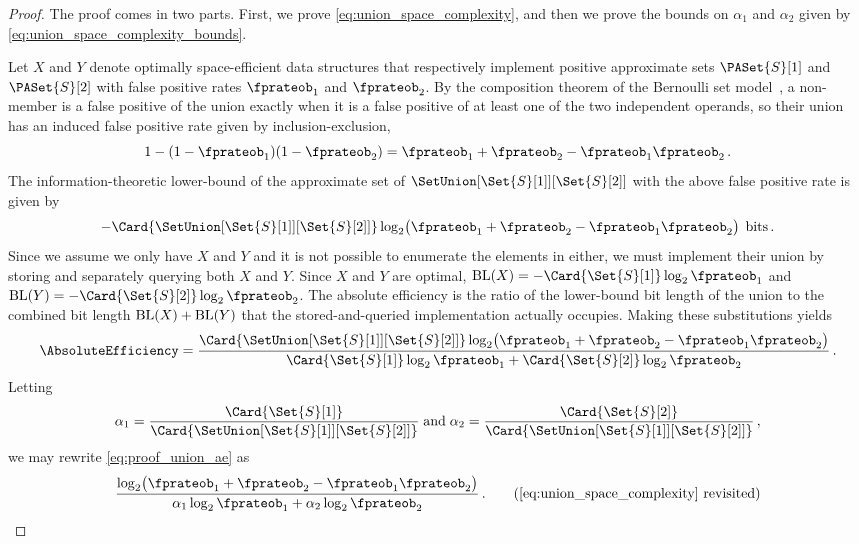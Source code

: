 \documentclass[ ../main.tex]{subfiles}
\begin{document}
\begin{proof}
The proof comes in two parts. First, we prove \cref{eq:union_space_complexity}, 
and then we prove the bounds on $\alpha_1$ and $\alpha_2$ given by 
\cref{eq:union_space_complexity_bounds}.

Let $X$ and $Y$ denote optimally space-efficient data structures that
respectively implement positive approximate sets $\PASet{S}[1]$ and
$\PASet{S}[2]$ with false positive rates $\fprateob_1$ and $\fprateob_2$. By
the composition theorem of the Bernoulli set model~\cite{bsets}, a non-member is
a false positive of the union exactly when it is a false positive of at least
one of the two independent operands, so their union has an induced false
positive rate given by inclusion-exclusion,
\begin{equation}
    1 - (1 - \fprateob_1)(1 - \fprateob_2)
        = \fprateob_1 + \fprateob_2 - \fprateob_1 \fprateob_2\,.
\end{equation}
The information-theoretic lower-bound of the approximate set of
$\SetUnion[\Set{S}[1]][\Set{S}[2]]$ with the above false positive rate is given
by
\begin{equation}
    -\Card{\SetUnion[\Set{S}[1]][\Set{S}[2]]}
        \log_2 \! \left(\fprateob_1 + \fprateob_2 -
        \fprateob_1 \fprateob_2\right) \; \si{bits}\,.
\end{equation}
Since we assume we only have $X$ and $Y$ and it is not possible to enumerate the
elements in either, we must implement their union by storing and separately
querying both $X$ and $Y$. Since $X$ and $Y$ are optimal,
$\BL(X) = -\Card{\Set{S}[1]} \log_2 \fprateob_1$ and
$\BL(Y) = -\Card{\Set{S}[2]} \log_2 \fprateob_2$.
The absolute efficiency is the ratio of the lower-bound bit length of the union
to the combined bit length $\operatorname{BL}(X) + \operatorname{BL}(Y)$ that the stored-and-queried
implementation actually occupies. Making these substitutions yields
\begin{equation}
\label{eq:proof_union_ae}
    \AbsoluteEfficiency = \frac{\Card{\SetUnion[\Set{S}[1]][\Set{S}[2]]} \log_2 \! \left(\fprateob_1 + \fprateob_2 - \fprateob_1 \fprateob_2\right)}{\Card{\Set{S}[1]} \log_2 \fprateob_1 + \Card{\Set{S}[2]} \log_2 \fprateob_2}\,.
\end{equation}
Letting
\begin{equation}
    \alpha_1 = \frac{\Card{\Set{S}[1]}}{\Card{\SetUnion[\Set{S}[1]][\Set{S}[2]]}} \; \text{and} \; \alpha_2 = \frac{\Card{\Set{S}[2]}}{\Card{\SetUnion[\Set{S}[1]][\Set{S}[2]]}}\,,
\end{equation}
we may rewrite \cref{eq:proof_union_ae} as
\begin{equation*}
    \frac{
        \log_2\!\left(\fprateob_1 + \fprateob_2 - \fprateob_1 \fprateob_2\right)}
    {
        \alpha_1 \log_2 \fprateob_1 + \alpha_2 \log_2 \fprateob_2
    }\,.\tag{\ref{eq:union_space_complexity} revisited}
\end{equation*}


\end{proof}
\end{document}
